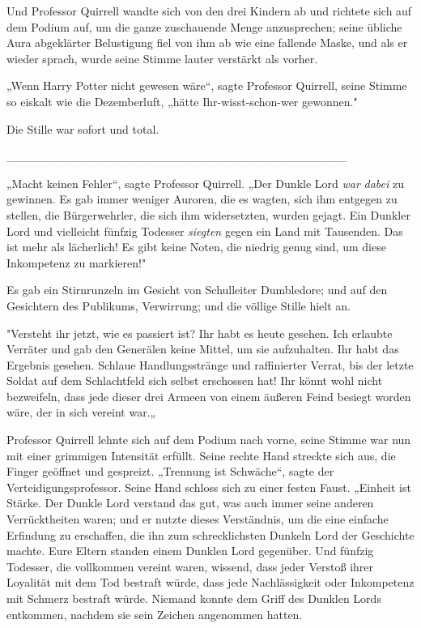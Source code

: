 {Und Professor Quirrell wandte sich von den drei Kindern ab und richtete sich auf dem Podium auf, um die ganze zuschauende Menge anzusprechen; seine übliche Aura abgeklärter Belustigung fiel von ihm ab wie eine fallende Maske, und als er wieder sprach, wurde seine Stimme lauter verstärkt als vorher.

„Wenn Harry Potter nicht gewesen wäre“, sagte Professor Quirrell, seine Stimme so eiskalt wie die Dezemberluft, „hätte Ihr-wisst-schon-wer gewonnen."

Die Stille war sofort und total.

\_\_\_\_\_\_\_\_\_\_\_\_\_\_\_\_\_\_\_\_\_\_\_\_\_\_\_\_\_\_\_\_\_\_\_\_\_\_\_\_

„Macht keinen Fehler“, sagte Professor Quirrell. „Der Dunkle Lord \emph{war} \emph{dabei} zu gewinnen. Es gab immer weniger Auroren, die es wagten, sich ihm entgegen zu stellen, die Bürgerwehrler, die sich ihm widersetzten, wurden gejagt. Ein Dunkler Lord und vielleicht fünfzig Todesser \emph{siegten} gegen ein Land mit Tausenden. Das ist mehr als lächerlich! Es gibt keine Noten, die niedrig genug sind, um diese Inkompetenz zu markieren!"

Es gab ein Stirnrunzeln im Gesicht von Schulleiter Dumbledore; und auf den Gesichtern des Publikums, Verwirrung; und die völlige Stille hielt an.

"Versteht ihr jetzt, wie es passiert ist? Ihr habt es heute gesehen. Ich erlaubte Verräter und gab den Generälen keine Mittel, um sie aufzuhalten. Ihr habt das Ergebnis gesehen. Schlaue Handlungsstränge und raffinierter Verrat, bis der letzte Soldat auf dem Schlachtfeld sich selbst erschossen hat! Ihr könnt wohl nicht bezweifeln, dass jede dieser drei Armeen von einem äußeren Feind besiegt worden wäre, der in sich vereint war.„

Professor Quirrell lehnte sich auf dem Podium nach vorne, seine Stimme war nun mit einer grimmigen Intensität erfüllt. Seine rechte Hand streckte sich aus, die Finger geöffnet und gespreizt. „Trennung ist Schwäche“, sagte der Verteidigungsprofessor. Seine Hand schloss sich zu einer festen Faust. „Einheit ist Stärke. Der Dunkle Lord verstand das gut, was auch immer seine anderen Verrücktheiten waren; und er nutzte dieses Verständnis, um die eine einfache Erfindung zu erschaffen, die ihn zum schrecklichsten Dunkeln Lord der Geschichte machte. Eure Eltern standen einem Dunklen Lord gegenüber. Und fünfzig Todesser, die vollkommen vereint waren, wissend, dass jeder Verstoß ihrer Loyalität mit dem Tod bestraft würde, dass jede Nachlässigkeit oder Inkompetenz mit Schmerz bestraft würde. Niemand konnte dem Griff des Dunklen Lords entkommen, nachdem sie sein Zeichen angenommen hatten.

}
